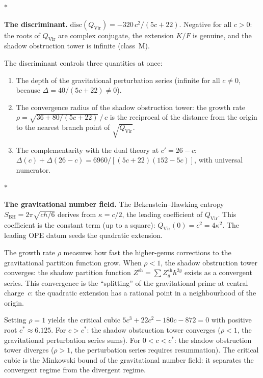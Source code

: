 \documentclass[11pt]{article}
\newcommand{\sep}{\bigskip\begin{center}$*$\end{center}\medskip}
\begin{document}
\sep

\noindent\textbf{The discriminant.}\enspace
$\mathrm{disc}(Q_{\mathrm{Vir}}) = -320\,c^2/(5c{+}22)$.
Negative for all $c > 0$: the roots of $Q_{\mathrm{Vir}}$
are complex conjugate, the extension $K/F$ is genuine, and
the shadow obstruction tower is infinite (class~M).

The discriminant controls three quantities at once:
\begin{enumerate}[label=(\roman*),nosep]
\item The depth of the gravitational perturbation series
  (infinite for all $c \neq 0$, because $\Delta = 40/(5c{+}22)
  \neq 0$).
\item The convergence radius of the shadow obstruction tower: the growth
  rate $\rho = \sqrt{36 + 80/(5c{+}22)}\,/\,c$ is the reciprocal
  of the distance from the origin to the nearest branch point
  of $\sqrt{Q_{\mathrm{Vir}}}$.
\item The complementarity with the dual theory at $c' = 26 - c$:
  $\Delta(c) + \Delta(26{-}c) = 6960/[(5c{+}22)(152{-}5c)]$,
  with universal numerator.
\end{enumerate}

\sep

\noindent\textbf{The gravitational number field.}\enspace
The Bekenstein--Hawking entropy $S_{\mathrm{BH}} = 2\pi\sqrt{ch/6}$
derives from $\kappa = c/2$, the leading coefficient of
$Q_{\mathrm{Vir}}$.  This coefficient is the constant term
(up to a square): $Q_{\mathrm{Vir}}(0) = c^2 = 4\kappa^2$.
The leading OPE datum seeds the quadratic extension.

The growth rate $\rho$ measures how fast the higher-genus
corrections to the gravitational partition function grow.
When $\rho < 1$, the shadow obstruction tower converges: the shadow
partition function $Z^{\mathrm{sh}} = \sum Z_g^{\mathrm{sh}}
\hbar^{2g}$ exists as a convergent series.  This convergence
is the ``splitting'' of the gravitational prime at central
charge~$c$: the quadratic extension has a rational point in
a neighbourhood of the origin.

Setting $\rho = 1$ yields the critical cubic
$5c^3 + 22c^2 - 180c - 872 = 0$ with positive root
$c^* \approx 6.125$.  For $c > c^*$: the shadow obstruction tower
converges ($\rho < 1$, the gravitational perturbation
series sums).  For $0 < c < c^*$: the shadow obstruction tower diverges
($\rho > 1$, the perturbation series requires resummation).
The critical cubic is the Minkowski bound of the gravitational
number field: it separates the convergent regime from the
divergent regime.
\end{document}
